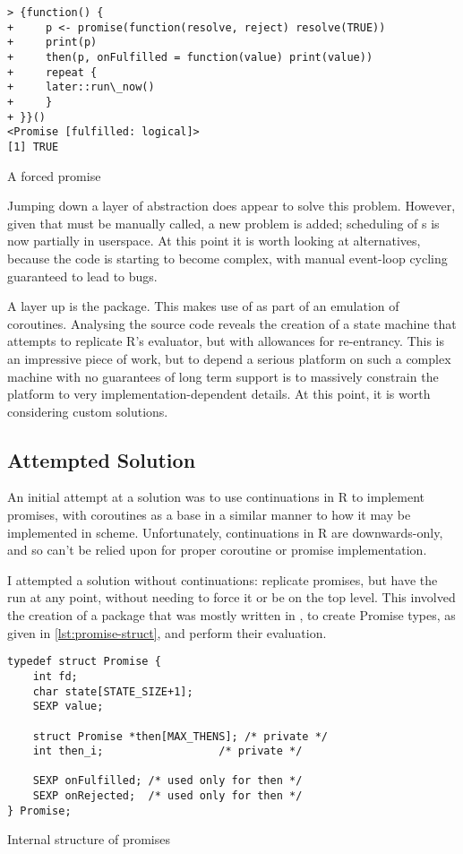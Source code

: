 \begin{listing}
\begin{verbatim}
> {function() {
+     p <- promise(function(resolve, reject) resolve(TRUE))
+     print(p)
+     then(p, onFulfilled = function(value) print(value))
+     repeat {
+     later::run\_now()
+     }
+ }}()
<Promise [fulfilled: logical]>
[1] TRUE
\end{verbatim}
\caption{A forced promise}
\label{lst:promise-forced}
\end{listing}

Jumping down a layer of abstraction does appear to solve this problem.
However, given that  must be manually called, a new problem is added; scheduling of s is now partially in userspace.
At this point it is worth looking at alternatives, because the code is starting to become complex, with manual event-loop cycling guaranteed to lead to bugs.

A layer up is the  package\cite{henry21coro}.
This makes use of  as part of an emulation of coroutines.
Analysing the source code reveals the creation of a state machine that attempts to replicate R's evaluator, but with allowances for re-entrancy.
This is an impressive piece of work, but to depend a serious platform on such a complex machine with no guarantees of long term support is to massively constrain the platform to very implementation-dependent details.
At this point, it is worth considering custom solutions.

\subsection{Attempted Solution}

An initial attempt at a solution was to use continuations in R to implement promises, with coroutines as a base in a similar manner to how it may be implemented in scheme.
Unfortunately, continuations in R are downwards-only, and so can't be relied upon for proper coroutine or promise implementation.

I attempted a solution without continuations: replicate promises, but have the  run at any point, without needing to force it or be on the top level.
This involved the creation of a package that was mostly written in , to create Promise types, as given in \ref{lst:promise-struct}, and perform their evaluation.

\begin{listing}
\begin{verbatim}
typedef struct Promise {
    int fd;
    char state[STATE_SIZE+1];
    SEXP value;

    struct Promise *then[MAX_THENS]; /* private */
    int then_i;		             /* private */

    SEXP onFulfilled; /* used only for then */
    SEXP onRejected;  /* used only for then */
} Promise;
\end{verbatim}
\caption{Internal structure of promises}
\label{lst:promise-struct}
\end{listing}

